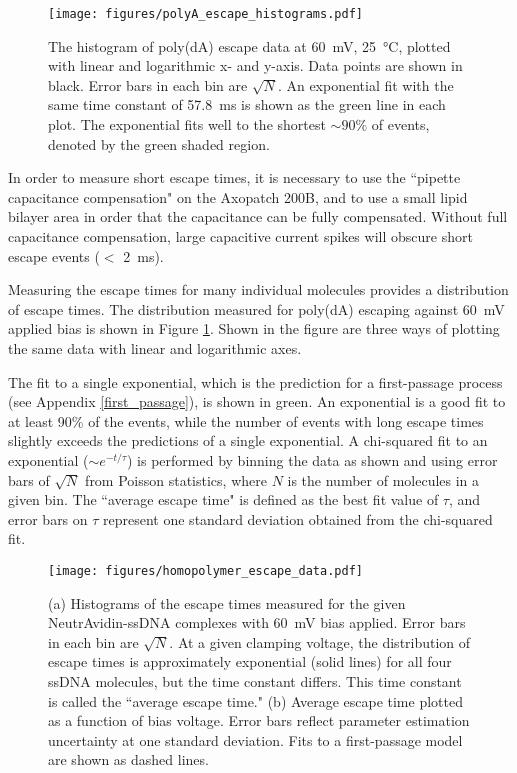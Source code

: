\begin{figure}[ht]
\begin{centering}
\texttt{[image: figures/polyA\_escape\_histograms.pdf]}
\caption[Measured escape times of poly(dA) ssDNA from MspA]{The histogram of poly(dA) escape data at \SI{60}{\mV}, \SI{25}{\celsius}, plotted with linear and logarithmic x- and y-axis.  Data points are shown in black.  Error bars in each bin are $\sqrt{N}$.  An exponential fit with the same time constant of \SI{57.8}{\ms} is shown as the green line in each plot.  The exponential fits well to the shortest $\sim 90\%$ of events, denoted by the green shaded region.}
\label{fig:polyA_escape_times}
\end{centering}
\end{figure}

In order to measure short escape times, it is necessary to use the ``pipette capacitance compensation" on the Axopatch 200B, and to use a small lipid bilayer area in order that the capacitance can be fully compensated.  Without full capacitance compensation, large capacitive current spikes will obscure short escape events ($<$ \SI{2}{\ms}).

Measuring the escape times for many individual molecules provides a distribution of escape times.  The distribution measured for poly(dA) escaping against \SI{60}{\mV} applied bias is shown in Figure \ref{fig:polyA_escape_times}.  Shown in the figure are three ways of plotting the same data with linear and logarithmic axes.

The fit to a single exponential, which is the prediction for a first-passage process (see Appendix \ref{first_passage}), is shown in green.  An exponential is a good fit to at least 90\% of the events, while the number of events with long escape times slightly exceeds the predictions of a single exponential.  A chi-squared fit to an exponential ($\sim e^{-t/\tau}$) is performed by binning the data as shown and using error bars of $\sqrt{N}$ from Poisson statistics, where $N$ is the number of molecules in a given bin.  The ``average escape time" is defined as the best fit value of $\tau$, and error bars on $\tau$ represent one standard deviation obtained from the chi-squared fit.

\begin{figure}[h]
\begin{centering}
\texttt{[image: figures/homopolymer\_escape\_data.pdf]}
\caption[Measured escape times of homopolymer ssDNA from MspA]{(a) Histograms of the escape times measured for the given NeutrAvidin-ssDNA complexes with \SI{60}{\mV} bias applied.  Error bars in each bin are $\sqrt{N}$.  At a given clamping voltage, the distribution of escape times is approximately exponential (solid lines) for all four ssDNA molecules, but the time constant differs.  This time constant is called the ``average escape time."  (b) Average escape time plotted as a function of bias voltage.  Error bars reflect parameter estimation uncertainty at one standard deviation.  Fits to a first-passage model are shown as dashed lines.}
\label{fig:escape_times}
\end{centering}
\end{figure}


